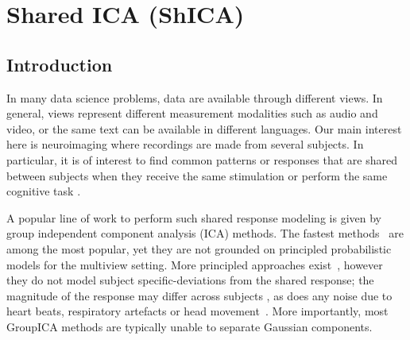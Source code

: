 \documentclass{report}
\begin{document}

\chapter{Shared ICA (ShICA)}
\section{Introduction}
In many data science problems, data are available through different views. In general, views represent different measurement modalities such as audio and video, or the same text can be available in different languages. Our main interest here is neuroimaging where recordings are made from several subjects. In particular, it is of interest to find common patterns or responses that are shared between subjects when they receive the same stimulation or perform the same cognitive task \citep{chen2015reduced,richard2020modeling}. 

A popular line of work to perform such shared response modeling is given by group independent component analysis (ICA) methods. The fastest methods~\cite{calhoun2001method, varoquaux2009canica} are among the most popular, yet they are not grounded on principled probabilistic models for the multiview setting. 
%
More principled approaches exist~\cite{richard2020modeling, guo2008unified}, however they do not model subject specific-deviations from the shared response; the magnitude of the response may differ across subjects \cite{penny2007random}, as does any noise due to heart beats, respiratory artefacts or head movement~\cite{liu2016noise}.
%
More importantly, most GroupICA methods are typically unable to separate Gaussian components.
\end{document}
